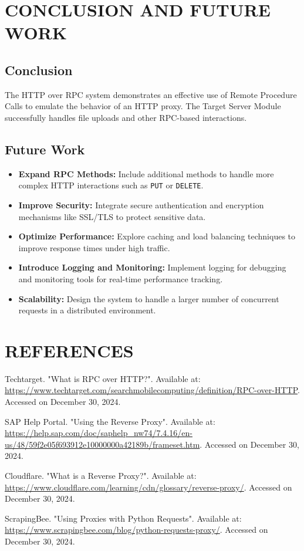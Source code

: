 \documentclass{article}
\begin{document}
\section{CONCLUSION AND FUTURE WORK} %
\subsection{Conclusion}
The HTTP over RPC system demonstrates an effective use of Remote Procedure Calls to emulate the behavior of an HTTP proxy. The Target Server Module successfully handles file uploads and other RPC-based interactions.

\subsection{Future Work}
\begin{itemize}
    \item \textbf{Expand RPC Methods:} Include additional methods to handle more complex HTTP interactions such as \texttt{PUT} or \texttt{DELETE}.
    \item \textbf{Improve Security:} Integrate secure authentication and encryption mechanisms like SSL/TLS to protect sensitive data.
    \item \textbf{Optimize Performance:} Explore caching and load balancing techniques to improve response times under high traffic.
    \item \textbf{Introduce Logging and Monitoring:} Implement logging for debugging and monitoring tools for real-time performance tracking.
    \item \textbf{Scalability:} Design the system to handle a larger number of concurrent requests in a distributed environment.
\end{itemize}

\section{REFERENCES} %

\begin{thebibliography}{99}

Techtarget. "What is RPC over HTTP?". Available at: \url{https://www.techtarget.com/searchmobilecomputing/definition/RPC-over-HTTP}. Accessed on December 30, 2024.

SAP Help Portal. "Using the Reverse Proxy". Available at: \url{https://help.sap.com/doc/saphelp_nw74/7.4.16/en-us/48/59f2e05f693912e10000000a42189b/frameset.htm}. Accessed on December 30, 2024.

Cloudflare. "What is a Reverse Proxy?". Available at: \url{https://www.cloudflare.com/learning/cdn/glossary/reverse-proxy/}. Accessed on December 30, 2024.

ScrapingBee. "Using Proxies with Python Requests". Available at: \url{https://www.scrapingbee.com/blog/python-requests-proxy/}. Accessed on December 30, 2024.

\end{thebibliography}
\end{document}
